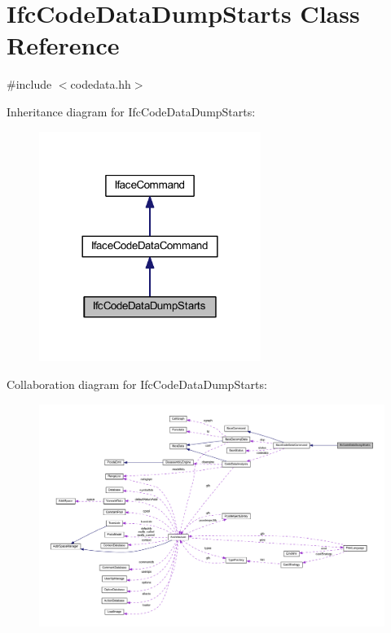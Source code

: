 \hypertarget{class_ifc_code_data_dump_starts}{}\section{Ifc\+Code\+Data\+Dump\+Starts Class Reference}
\label{class_ifc_code_data_dump_starts}


{\ttfamily \#include $<$codedata.\+hh$>$}



Inheritance diagram for Ifc\+Code\+Data\+Dump\+Starts\+:
\nopagebreak
\begin{figure}[H]
\begin{center}
\leavevmode
\includegraphics[width=204pt]{class_ifc_code_data_dump_starts__inherit__graph}
\end{center}
\end{figure}


Collaboration diagram for Ifc\+Code\+Data\+Dump\+Starts\+:
\nopagebreak
\begin{figure}[H]
\begin{center}
\leavevmode
\includegraphics[width=350pt]{class_ifc_code_data_dump_starts__coll__graph}
\end{center}
\end{figure}

